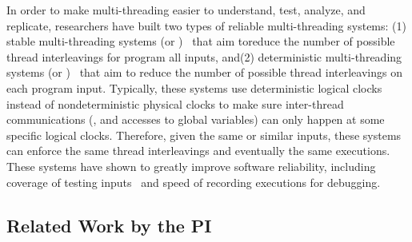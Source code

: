   In order to make multi-threading easier to 
understand, test, analyze, and replicate, researchers have built two types of 
reliable multi-threading systems: (1) stable multi-threading systems (or 
\smt)~\cite{grace:oopsla09, dthreads:sosp11, determinator:osdi10} 
that aim toreduce the number of possible thread interleavings for program all 
inputs, and(2) deterministic multi-threading systems (or 
\dmt)~\cite{dpj:oopsla09,dmp:asplos09,kendo:asplos09,coredet:asplos10,
dos:osdi10,ddos:asplos13, ics:oopsla13} that aim to reduce the number of 
possible thread interleavings on each program input. Typically, these systems 
use deterministic logical clocks 
instead of nondeterministic physical clocks to make sure inter-thread 
communications (\eg, \mutexlock and accesses to global variables) can only 
happen at some specific logical clocks. Therefore, given the same or similar 
inputs, these systems can enforce the same thread interleavings and eventually 
the same executions. These systems 
have shown to greatly improve software reliability, including coverage of 
testing inputs~\cite{ics:oopsla13} and speed of recording 
executions\cite{dos:osdi10} for debugging.


% 


\subsection{Related Work by the PI} \label{sec:my-work}
% 

